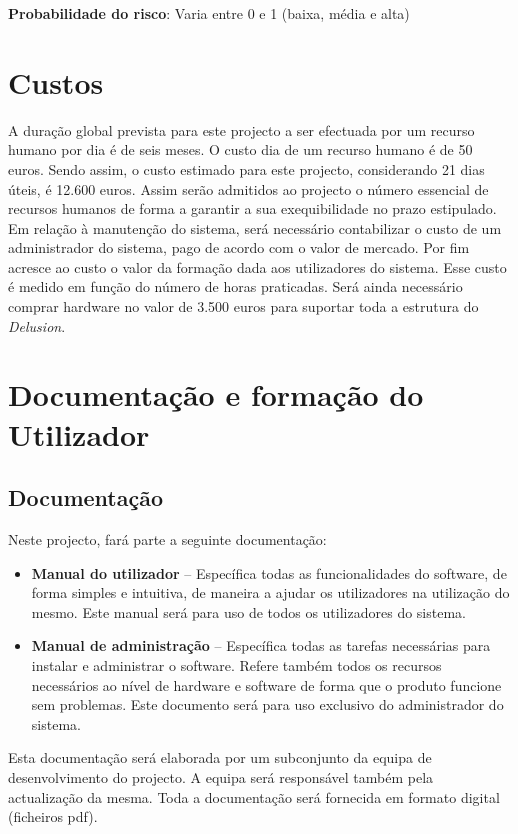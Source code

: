 \textbf{Probabilidade do risco}: Varia entre 0 e 1 (baixa, média e alta)
 
\section{Custos}
A duração global prevista para este projecto a ser efectuada por um recurso humano por dia é de seis meses. O custo dia de um recurso humano é de 50 euros. Sendo assim, o custo estimado para este projecto, considerando 21 dias úteis, é 12.600 euros. Assim serão admitidos ao projecto o número essencial de recursos humanos de forma a garantir a sua exequibilidade no prazo estipulado. 
Em relação à manutenção do sistema, será necessário contabilizar o custo de um administrador do sistema, pago de acordo com o valor de mercado.
Por fim acresce ao custo o valor da formação dada aos utilizadores do sistema. Esse custo é medido em função do número de horas praticadas.
Será ainda necessário comprar hardware no valor de 3.500 euros para suportar toda a estrutura do \textit{Delusion}.

\section{Documentação e formação do Utilizador}
\subsection{Documentação}
Neste projecto, fará parte a seguinte documentação:

\begin{itemize}
\item \textbf{Manual do utilizador} – Específica todas as funcionalidades do software, de forma simples e intuitiva, de maneira a ajudar os utilizadores na utilização do mesmo. Este manual será para uso de todos os utilizadores do sistema.

\item \textbf{Manual de administração} – Específica todas as tarefas necessárias para instalar e administrar o software. Refere também todos os recursos necessários ao nível de hardware e software de forma que o produto funcione sem problemas. Este documento será para uso exclusivo do administrador do sistema.
\end{itemize}

Esta documentação será elaborada por um subconjunto da equipa de desenvolvimento do projecto. A equipa será responsável também pela actualização da mesma. Toda a documentação será fornecida em formato digital (ficheiros pdf). 

